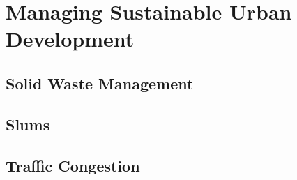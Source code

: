 \documentclass[../../main]{subfiles}
\begin{document}
\section{Managing Sustainable Urban Development}

\subsection{Solid Waste Management}

	\begin{description}
	\end{description}

\subsection{Slums}

	\begin{description}
	\end{description}

\subsection{Traffic Congestion}

	\begin{description}
	\end{description}
\end{document}
